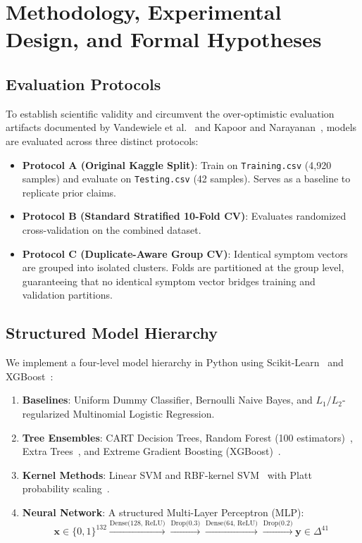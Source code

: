 \chapter{Methodology, Experimental Design, and Formal Hypotheses}
\label{chap:methodology}

\section{Evaluation Protocols}
\label{sec:evaluation_protocols}
To establish scientific validity and circumvent the over-optimistic evaluation artifacts documented by Vandewiele et al.~\cite{vandewiele2021overly} and Kapoor and Narayanan~\cite{kapoor2023leakage}, models are evaluated across three distinct protocols:
\begin{itemize}
    \item \textbf{Protocol A (Original Kaggle Split)}: Train on \texttt{Training.csv} (4,920 samples) and evaluate on \texttt{Testing.csv} (42 samples). Serves as a baseline to replicate prior claims.
    \item \textbf{Protocol B (Standard Stratified 10-Fold CV)}: Evaluates randomized cross-validation on the combined dataset.
    \item \textbf{Protocol C (Duplicate-Aware Group CV)}: Identical symptom vectors are grouped into isolated clusters. Folds are partitioned at the group level, guaranteeing that no identical symptom vector bridges training and validation partitions.
\end{itemize}

\section{Structured Model Hierarchy}
\label{sec:model_hierarchy}
We implement a four-level model hierarchy in Python using Scikit-Learn~\cite{pedregosa2011scikit} and XGBoost~\cite{chen2016xgboost}:
\begin{enumerate}
    \item \textbf{Baselines}: Uniform Dummy Classifier, Bernoulli Naive Bayes, and $L_1/L_2$-regularized Multinomial Logistic Regression.
    \item \textbf{Tree Ensembles}: CART Decision Trees, Random Forest (100 estimators)~\cite{breiman2001random}, Extra Trees~\cite{geurts2006extremely}, and Extreme Gradient Boosting (XGBoost)~\cite{chen2016xgboost}.
    \item \textbf{Kernel Methods}: Linear SVM and RBF-kernel SVM~\cite{cortes1995support} with Platt probability scaling~\cite{platt1999probabilistic}.
    \item \textbf{Neural Network}: A structured Multi-Layer Perceptron (MLP):
    \begin{equation}
        \mathbf{x} \in \{0, 1\}^{132} \xrightarrow{\text{Dense(128, ReLU)}} \xrightarrow{\text{Drop(0.3)}} \xrightarrow{\text{Dense(64, ReLU)}} \xrightarrow{\text{Drop(0.2)}} \mathbf{y} \in \Delta^{41}
    \end{equation}
\end{enumerate}

